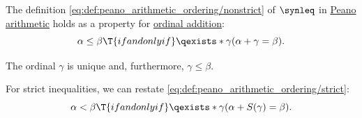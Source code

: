 \begin{proposition}\label{thm:ordinal_ordering_via_addition}
  The definition \eqref{eq:def:peano_arithmetic_ordering/nonstrict} of \( {\synleq} \) in \hyperref[def:peano_arithmetic]{Peano arithmetic} holds as a property for \hyperref[def:ordinal_addition]{ordinal addition}:
  \begin{equation*}
    \alpha \leq \beta \T{if and only if} \qexists* \gamma (\alpha + \gamma = \beta).
  \end{equation*}

  The ordinal \( \gamma \) is unique and, furthermore, \( \gamma \leq \beta \).
\end{proposition}
\begin{comments}
  \item For strict inequalities, we can restate \eqref{eq:def:peano_arithmetic_ordering/strict}:
  \begin{equation*}
    \alpha < \beta \T{if and only if} \qexists* \gamma (\alpha + S(\gamma) = \beta).
  \end{equation*}
\end{comments}
